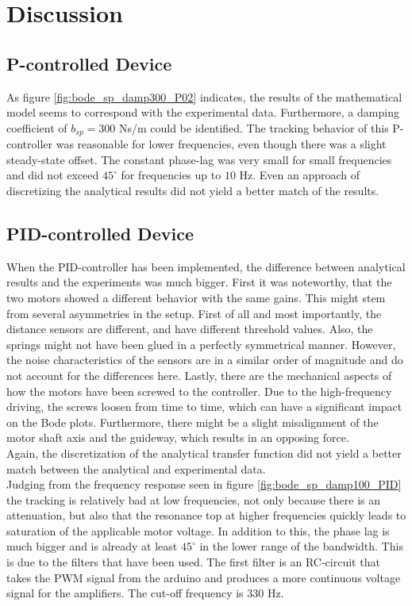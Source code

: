 \section{Discussion}
\subsection{P-controlled Device}
As figure \ref{fig:bode_sp_damp300_P02} indicates, the results of the mathematical model seems to correspond with the experimental data. Furthermore, a damping coefficient of $b_{sp} = 300$ Ns/m could be identified. The tracking behavior of this P-controller was reasonable for lower frequencies, even though there was a slight steady-state offset. The constant phase-lag was very small for small frequencies and did not exceed $45^\circ$ for frequencies up to $10$ Hz. Even an approach of discretizing the analytical results did not yield a better match of the results. %
 
\subsection{PID-controlled Device}
When the PID-controller has been implemented, the difference between analytical results and the experiments was much bigger. First it was noteworthy, that the two motors showed a different behavior with the same gains. This might stem from several asymmetries in the setup. First of all and most importantly, the distance sensors are different, and have different threshold values. Also, the springs might not have been glued in a perfectly symmetrical manner. However, the noise characteristics of the sensors are in a similar order of magnitude and do not account for the differences here. Lastly, there are the mechanical aspects of how the motors have been screwed to the controller. Due to the high-frequency driving, the screws loosen from time to time, which can have a significant impact on the Bode plots. Furthermore, there might be a slight misalignment of the motor shaft axis and the guideway, which results in an opposing force.\\
Again, the discretization of the analytical transfer function did not yield a better match between the analytical and experimental data.\\
Judging from the frequency response seen in figure \ref{fig:bode_sp_damp100_PID} the tracking is relatively bad at low frequencies, not only because there is an attenuation, but also that the resonance top at higher frequencies quickly leads to saturation of the applicable motor voltage. In addition to this, the phase lag is much bigger and is already at least $45 ^\circ$ in the lower range of the bandwidth. This is due to the filters that have been used. The first filter is an RC-circuit that takes the PWM signal from the arduino and produces a more continuous voltage signal for the amplifiers. The cut-off frequency is $330$ Hz. 

